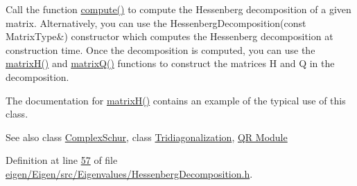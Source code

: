 Call the function \hyperlink{group___eigenvalues___module_a239a6fd42c57aab3c0b048c47fde3004}{compute()} to compute the Hessenberg decomposition of a given matrix. Alternatively, you can use the Hessenberg\+Decomposition(const Matrix\+Type\&) constructor which computes the Hessenberg decomposition at construction time. Once the decomposition is computed, you can use the \hyperlink{group___eigenvalues___module_a8e781d2e22a2304647bcf0ae913cc8ea}{matrix\+H()} and \hyperlink{group___eigenvalues___module_a346441e4902a58d43d698ac3da6ff791}{matrix\+Q()} functions to construct the matrices H and Q in the decomposition.

The documentation for \hyperlink{group___eigenvalues___module_a8e781d2e22a2304647bcf0ae913cc8ea}{matrix\+H()} contains an example of the typical use of this class.

\begin{DoxySeeAlso}{See also}
class \hyperlink{group___eigenvalues___module_class_eigen_1_1_complex_schur}{Complex\+Schur}, class \hyperlink{group___eigenvalues___module_class_eigen_1_1_tridiagonalization}{Tridiagonalization}, \hyperlink{group___q_r___module}{QR Module} 
\end{DoxySeeAlso}


Definition at line \hyperlink{eigen_2_eigen_2src_2_eigenvalues_2_hessenberg_decomposition_8h_source_l00057}{57} of file \hyperlink{eigen_2_eigen_2src_2_eigenvalues_2_hessenberg_decomposition_8h_source}{eigen/\+Eigen/src/\+Eigenvalues/\+Hessenberg\+Decomposition.\+h}.

